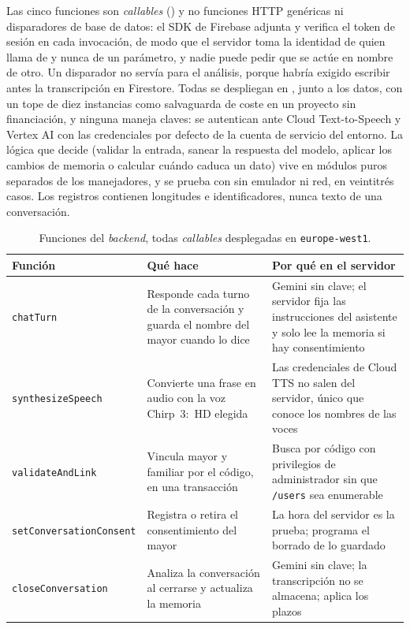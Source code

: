 Las cinco funciones son \emph{callables} () y no funciones HTTP genéricas ni disparadores de base de datos: el SDK de Firebase adjunta y verifica el token de sesión en cada invocación, de modo que el servidor toma la identidad de quien llama de  y nunca de un parámetro, y nadie puede pedir que se actúe en nombre de otro. Un disparador no servía para el análisis, porque habría exigido escribir antes la transcripción en Firestore. Todas se despliegan en , junto a los datos, con un tope de diez instancias como salvaguarda de coste en un proyecto sin financiación, y ninguna maneja claves: se autentican ante Cloud Text-to-Speech y Vertex AI con las credenciales por defecto de la cuenta de servicio del entorno. La lógica que decide (validar la entrada, sanear la respuesta del modelo, aplicar los cambios de memoria o calcular cuándo caduca un dato) vive en módulos puros separados de los manejadores, y se prueba con  sin emulador ni red, en veintitrés casos. Los registros contienen longitudes e identificadores, nunca texto de una conversación.

\begin{table}[htbp]
    \centering
    \caption{Funciones del \emph{backend}, todas \emph{callables} desplegadas en \texttt{europe-west1}.}
    \label{tab:callables}
    \small
    \begin{tabularx}{\textwidth}{@{}l >{\RaggedRight\arraybackslash}X >{\RaggedRight\arraybackslash}X@{}}
        \toprule
        \textbf{Función} & \textbf{Qué hace} & \textbf{Por qué en el servidor} \\
        \midrule
        \texttt{chatTurn}               & Responde cada turno de la conversación y guarda el nombre del mayor cuando lo dice & Gemini sin clave; el servidor fija las instrucciones del asistente y solo lee la memoria si hay consentimiento \\
        \addlinespace
        \texttt{synthesizeSpeech}       & Convierte una frase en audio con la voz Chirp~3:~HD elegida & Las credenciales de Cloud TTS no salen del servidor, único que conoce los nombres de las voces \\
        \addlinespace
        \texttt{validateAndLink}        & Vincula mayor y familiar por el código, en una transacción & Busca por código con privilegios de administrador sin que \texttt{/users} sea enumerable \\
        \addlinespace
        \texttt{setConversationConsent} & Registra o retira el consentimiento del mayor & La hora del servidor es la prueba; programa el borrado de lo guardado \\
        \addlinespace
        \texttt{closeConversation}      & Analiza la conversación al cerrarse y actualiza la memoria & Gemini sin clave; la transcripción no se almacena; aplica los plazos \\
        \bottomrule
    \end{tabularx}

\end{table}


